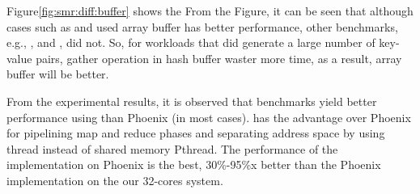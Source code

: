 Figure\ref{fig:smr:diff:buffer} shows the 
From the Figure, it can be seen that although cases such as  and  used array buffer has better performance, other benchmarks, e.g., ,  and , did not.
So, for workloads that did generate a large number of key-value pairs, gather operation in hash buffer waster more time, as a result, array buffer will be better.

From the experimental results, it is observed that benchmarks yield better performance using \myds than Phoenix (in most cases). 
\myds has the advantage over Phoenix for pipelining map and reduce phases and separating address space by using \myth thread instead of shared memory Pthread. 
The performance of the  implementation on Phoenix is the best, 30\%-95\%x better than the Phoenix implementation on the our 32-cores system.

